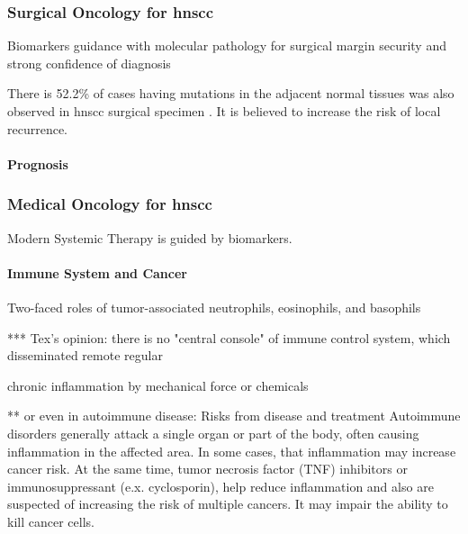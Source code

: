 \documentclass[12pt, a4paper]{article}
\begin{document}
\subsubsection{Surgical Oncology for \acrshort{hnscc}}
Biomarkers guidance with molecular pathology for surgical margin security and strong confidence of diagnosis

There is 52.2\% of cases having mutations in the adjacent normal tissues was also observed in \acrshort{hnscc} surgical specimen \citep{Singh2016}. It is believed to increase the risk of local recurrence.

\paragraph{Prognosis}








\subsubsection{Medical Oncology for \acrshort{hnscc}}
Modern Systemic Therapy is guided by biomarkers.

\paragraph{Immune System and Cancer}
Two-faced roles of tumor-associated neutrophils, eosinophils, and basophils

*** Tex's opinion: there is no "central console" of immune control system, which disseminated remote regular %

chronic inflammation by mechanical force or chemicals

** or even in autoimmune disease:
Risks from disease and treatment
Autoimmune disorders generally attack a single organ or part of the body, often causing inflammation in the affected area. In some cases, that inflammation may increase cancer risk. 
At the same time, tumor necrosis factor (TNF) inhibitors or immunosuppressant (e.x. cyclosporin), help reduce inflammation and also are suspected of increasing the risk of multiple cancers. It may impair the ability to kill cancer cells.
\end{document}
